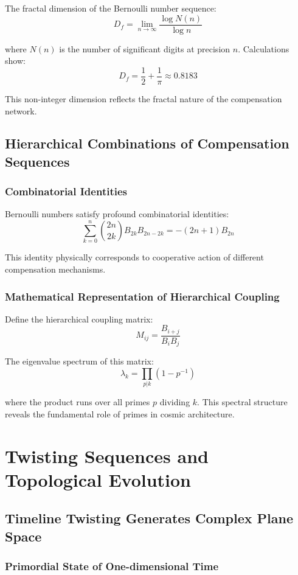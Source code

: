 \documentclass[11pt]{article}
\begin{document}
The fractal dimension of the Bernoulli number sequence:
$$D_f = \lim_{n \to \infty} \frac{\log N(n)}{\log n}$$

where $N(n)$ is the number of significant digits at precision $n$. Calculations show:
$$D_f = \frac{1}{2} + \frac{1}{\pi} \approx 0.8183$$

This non-integer dimension reflects the fractal nature of the compensation network.

\subsection{Hierarchical Combinations of Compensation Sequences}

\subsubsection{Combinatorial Identities}

Bernoulli numbers satisfy profound combinatorial identities:
$$\sum_{k=0}^{n} \binom{2n}{2k} B_{2k} B_{2n-2k} = -(2n+1)B_{2n}$$

This identity physically corresponds to cooperative action of different compensation mechanisms.

\subsubsection{Mathematical Representation of Hierarchical Coupling}

Define the hierarchical coupling matrix:
$$M_{ij} = \frac{B_{i+j}}{B_i B_j}$$

The eigenvalue spectrum of this matrix:
$$\lambda_k = \prod_{p|k} \left(1 - p^{-1}\right)$$

where the product runs over all primes $p$ dividing $k$. This spectral structure reveals the fundamental role of primes in cosmic architecture.

\section{Twisting Sequences and Topological Evolution}

\subsection{Timeline Twisting Generates Complex Plane Space}

\subsubsection{Primordial State of One-dimensional Time}
\end{document}
